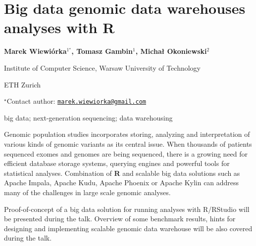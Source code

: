 \documentclass[\main/boa.tex]{subfiles}
\begin{document}
\section{Big data genomic data warehouses analyses with R}

\begin{center}
  {\bf {} Marek Wiewiórka$^{1^\star}$,  Tomasz Gambin$^{1}$,  Michał Okoniewski$^{2}$}
\end{center}

\vskip 0.3cm

\begin{affiliations}
\begin{enumerate}
\begin{minipage}{0.915\textwidth}
\centering
\item Institute of Computer Science, Warsaw University of Technology \\[-2pt]
\item ETH Zurich \\[-2pt]
\end{minipage}
\end{enumerate}
$^\star$Contact author: \href{mailto:marek.wiewiorka@gmail.com}{\nolinkurl{marek.wiewiorka@gmail.com}}\\
\end{affiliations}

\vskip 0.5cm

\begin{minipage}{0.915\textwidth}
\keywords big data; next-generation sequencing; data warehousing
\end{minipage}

\vskip 0.8cm


Genomic population studies incorporates storing, analyzing and interpretation of various kinds of genomic variants
as its central issue. When thousands of patients sequenced exomes and genomes are being sequenced, 
there is a growing need for efficient database storage systems, querying engines and powerful tools for statistical analyses.
Combination of \textbf{R} and scalable big data solutions such as Apache Impala, Apache Kudu, Apache Phoenix or Apache Kylin can address
many of the challenges in large scale genomic analyses.

Proof-of-concept of a big data solution for running analyses with R/RStudio will be presented during the talk.
Overview of some benchmark results, hints for designing and implementing scalable genomic data warehouse will be also covered
during the talk.
\end{document}
